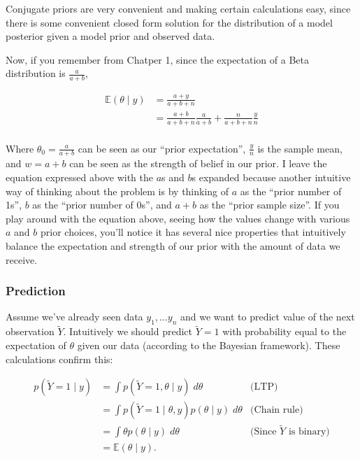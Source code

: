 \documentclass[]{article}
\begin{document}
Conjugate priors are very convenient and making certain calculations
easy, since there is some convenient closed form solution for the
distribution of a model posterior given a model prior and observed data.

Now, if you remember from Chatper 1, since the expectation of a Beta
distribution is \(\frac{a}{a + b}\),

\begin{align}
\mathbb{E}(\theta \mid y) &= \frac{a + y}{a + b + n} \\
&= \frac{a + b}{a + b + n} \frac{a}{a + b} + \frac{n}{a + b + n}\frac{y}{n} \\
\end{align}

Where \(\theta_0 = \frac{a}{a + b}\) can be seen as our ``prior
expectation'', \(\frac{y}{n}\) is the sample mean, and \(w = a + b\) can
be seen as the strength of belief in our prior. I leave the equation
expressed above with the \(a\)s and \(b\)s expanded because another
intuitive way of thinking about the problem is by thinking of \(a\) as
the ``prior number of 1s'', \(b\) as the ``prior number of 0s'', and
\(a + b\) as the ``prior sample size''. If you play around with the
equation above, seeing how the values change with various \(a\) and
\(b\) prior choices, you'll notice it has several nice properties that
intuitively balance the expectation and strength of our prior with the
amount of data we receive.

\hypertarget{prediction}{%
\subsubsection{Prediction}\label{prediction}}

Assume we've already seen data \(y_1, \dots y_n\) and we want to predict
value of the next observation \(\tilde{Y}\). Intuitively we should
predict \(\tilde{Y} = 1\) with probability equal to the expectation of
\(\theta\) given our data (according to the Bayesian framework). These
calculations confirm this:

\begin{align}
p(\tilde{Y} = 1 \mid y) &= \int p(\tilde{Y} = 1, \theta \mid y) \; d\theta & \text{(LTP)} \\
&= \int p(\tilde{Y} = 1 \mid \theta, y) p(\theta \mid y) \; d\theta & \text{(Chain rule)} \\
&= \int \theta p(\theta \mid y) \; d\theta & \text{(Since $\tilde{Y}$ is binary)} \\
&= \mathbb{E}(\theta \mid y).
\end{align}
\end{document}
